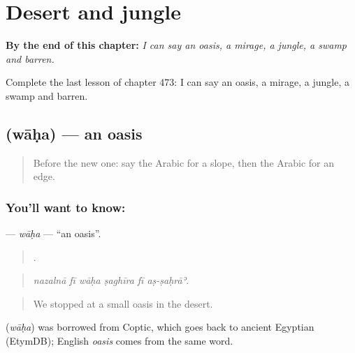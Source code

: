 
\chapter{Desert and jungle}
\label{ch:ar-desert-and-jungle}

\begin{chapteropening}
\textbf{By the end of this chapter:} \emph{I can say an oasis, a mirage, a jungle, a swamp and barren.}

Complete the last lesson of chapter 473: I can say an oasis, a mirage, a jungle, a swamp and barren.
\end{chapteropening}

\section[\texorpdfstring{\ar{واحة} (wāḥa)}{واحة (wāḥa)}]{ (wāḥa) — an oasis}

\label{lesson:AR-C473-waha}



\begin{quote}
Before the new one: say the Arabic for a slope, then the Arabic for an edge.
\end{quote}

\subsection*{You'll want to know: }
\textbf{} — \emph{wāḥa} — \textquotedblleft{}an oasis\textquotedblright{}.

\begin{quote}
     .
\end{quote}

\begin{quote}
\emph{nazalnā fī wāḥa ṣaghīra fī aṣ-ṣaḥrāʾ.}
\end{quote}

\begin{quote}
We stopped at a small oasis in the desert.
\end{quote}

\begin{cousinweb}
\textbf{} (\emph{wāḥa}) was borrowed from Coptic, which goes back to ancient Egyptian (EtymDB); English \emph{oasis} comes from the same word.
\end{cousinweb}

